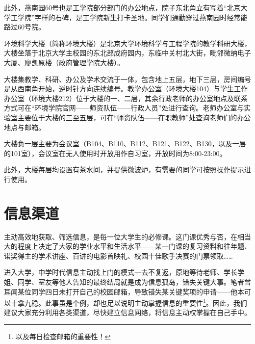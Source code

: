 \documentclass[11pt,oneside]{book}
\begin{document}
\vspace{10pt}

此外，燕南园60号也是工学院部分部门的办公地点，院子东北角立有写着“北京大学工学院”字样的石碑，是工学院新生打卡圣地。同学们通勤穿过燕南园时经常能路过60号院。

\vspace{10pt}

环境科学大楼（简称环境大楼）是北京大学环境科学与工程学院的教学科研大楼，大楼坐落于北京大学主校园的东北部成府园内，东临中关村北大街，毗邻微纳电子大厦、廖凯原楼（政府管理学院大楼）。

\vspace{10pt}

大楼集教学、科研、办公及学术交流于一体，包含地上五层，地下三层，房间编号是从西南角开始，逆时针方向连续编号。教学办公室（环境大楼104）与学生工作办公室（环境大楼212）位于大楼的一、二层，其余行政老师的办公室地点及联系方式可在“环境学院官网——师资队伍——行政人员”处进行查询。老师办公室与实验室主要位于大楼的三至五层，可在“师资队伍——在职教师”处查询老师们的办公地点与邮箱。

\vspace{10pt}

大楼负一层主要为会议室（B104、B110、B112、B121、B122、B130，以及一层的101室），会议室在无人使用时开放用作自习室，开放时间为8:00-23:00。

\vspace{10pt}

此外，大楼每层均设置有茶水间，并提供微波炉，有需要的同学可按照操作提示进行使用。

\section{信息渠道}
主动高效地获取、筛选信息，是每一位大学生的必修课。这门课优秀与否，在相当大的程度上决定了大家的学业水平和生活水平——某一门课的复习资料和往年题、诺奖得主的学术讲座、百讲的电影首映礼、校园十佳歌手决赛的门票领取……

\vspace{10pt}

进入大学，中学时代信息主动找上门的模式一去不复返，原地等待老师、学长学姐、同学、室友等他人告知的最终结局就是成为信息孤岛，错失关键大事。笔者曾耳闻某位同学四日未打开自己的校园邮箱，导致错失某关键奖项的申请——他本可以十拿九稳。此事虽是个例，却也足以说明主动掌握信息的重要性\footnote{以及每日检查邮箱的重要性！}。因此，我们建议大家充分利用各类渠道，尽快建立信息网络，将信息主动权掌握在自己手中。

\vspace{10pt}
\end{document}
